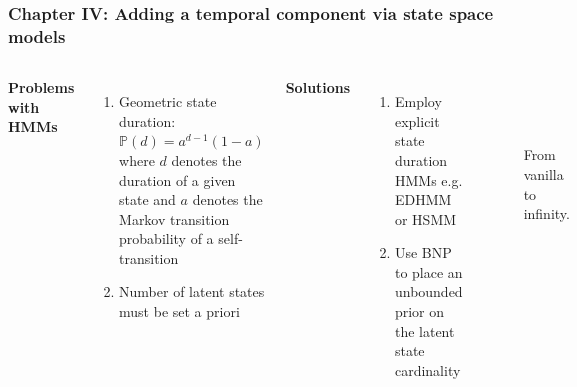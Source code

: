 \documentclass[aspectratio=169]{beamer}
\begin{document}
\begin{frame}
    \frametitle{Chapter IV: Adding a temporal component via state space models}

    \begin{columns}
        {\bf Problems with HMMs}
        \begin{enumerate}
            \item Geometric state duration: $\mathbb{P}(d) = a^{d-1} (1-a)$ where $d$ denotes the duration of a given state and $a$ denotes the Markov transition probability of a self-transition
            \item Number of latent states must be set a priori
        \end{enumerate}
        {\bf Solutions}
        \begin{enumerate}
            \item Employ explicit state duration HMMs e.g. EDHMM or HSMM
            \item Use BNP to place an unbounded prior on the latent state cardinality
        \end{enumerate}
        \begin{figure}
            \\
            \\
            \caption{From vanilla to infinity.}
        \end{figure}
    \end{columns}

\end{frame}
\end{document}
